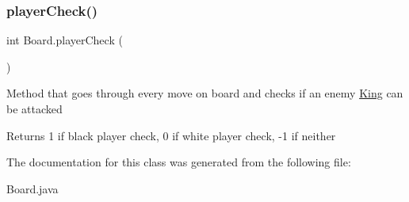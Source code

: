 \subsubsection{\texorpdfstring{playerCheck()}{playerCheck()}}
{\footnotesize\ttfamily int Board.\+player\+Check (\begin{DoxyParamCaption}{ }\end{DoxyParamCaption})\hspace{0.3cm}{\ttfamily [inline]}}

Method that goes through every move on board and checks if an enemy \mbox{\hyperlink{class_king}{King}} can be attacked \begin{DoxyReturn}{Returns}
1 if black player check, 0 if white player check, -\/1 if neither 
\end{DoxyReturn}


The documentation for this class was generated from the following file\+:\begin{DoxyCompactItemize}
\item 
Board.\+java\end{DoxyCompactItemize}
